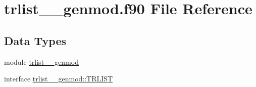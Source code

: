 \hypertarget{trlist____genmod_8f90}{\section{trlist\+\_\+\+\_\+genmod.\+f90 File Reference}
\label{trlist____genmod_8f90}
}
\subsection*{Data Types}
\begin{DoxyCompactItemize}
\item 
module \hyperlink{classtrlist____genmod}{trlist\+\_\+\+\_\+genmod}
\item 
interface \hyperlink{interfacetrlist____genmod_1_1TRLIST}{trlist\+\_\+\+\_\+genmod\+::\+T\+R\+L\+I\+S\+T}
\end{DoxyCompactItemize}
